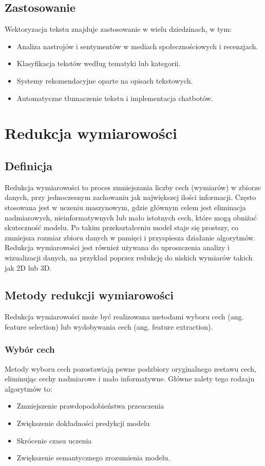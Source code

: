 	\subsection{Zastosowanie}
		Wektoryzacja tekstu znajduje zastosowanie w wielu dziedzinach, w tym:
		\begin{itemize}
			\item Analiza nastrojów i sentymentów w mediach społecznościowych i recenzjach.
			\item Klasyfikacja tekstów według tematyki lub kategorii.
			\item Systemy rekomendacyjne oparte na opisach tekstowych.
			\item Automatyczne tłumaczenie tekstu i implementacja chatbotów.
		\end{itemize}


\section{Redukcja wymiarowości}

	\subsection{Definicja}
		Redukcja wymiarowości to proces zmniejszania liczby cech (wymiarów) w zbiorze danych, przy jednoczesnym zachowaniu jak największej ilości informacji. Często stosowana jest w uczeniu maszynowym, gdzie głównym celem jest eliminacja nadmiarowych, nieinformatywnych lub mało istotnych cech, które mogą obniżać skuteczność modelu. Po takim przekształceniu model staje się prostszy, co zmniejsza rozmiar zbioru danych w pamięci i przyspiesza działanie algorytmów. Redukcja wymiarowości jest również używana do uproszczenia analizy i wizualizacji danych, na przykład poprzez redukcję do niskich wymiarów takich jak 2D lub 3D. \cite{DimensionReduction}

	\subsection{Metody redukcji wymiarowości}
		Redukcja wymiarowości może być realizowana metodami wyboru cech (ang. feature selection) lub wydobywania cech (ang. feature extraction).
		
		
		\subsubsection{Wybór cech}
			Metody wyboru cech pozostawiają pewne podzbiory oryginalnego zestawu cech, eliminując cechy nadmiarowe i mało informatywne. Główne zalety tego rodzaju algorytmów to:
			\begin{itemize}
				\item Zmniejszenie prawdopodobieństwa przeuczenia
				\item Zwiększenie dokładności predykcji modelu
				\item Skrócenie czasu uczenia
				\item Zwiększenie semantycznego zrozumienia modelu.
			\end{itemize}
		
